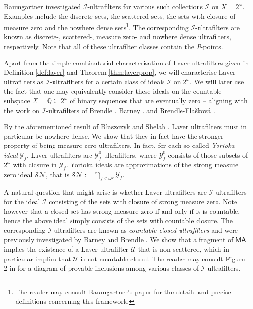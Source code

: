 \documentclass[12pt]{article}
\theoremstyle{definition}
\begin{document}
Baumgartner investigated $\mathcal{I}$-ultrafilters for various such collections $\mathcal{I}$ on $X=2^\omega$. Examples include the discrete sets, the scattered sets, the sets with closure of measure zero and the nowhere dense sets\footnote{The reader may consult Baumgartner's paper for the details and precise definitions concerning this framework.}. The corresponding $\mathcal{I}$-ultrafilters are known as discrete-, scattered-, measure zero- and nowhere dense ultrafilters, respectively. Note that all of these ultrafilter classes contain the $P$-points.

Apart from the simple combinatorial characterisation of Laver ultrafilters given in Definition \ref{def:laver} and Theorem \ref{thm:laverprop}, we will characterise Laver ultrafilters as $\mathcal{I}$-ultrafilters for a certain class of ideals $\mathcal{I}$ on $2^\omega$. We will later use the fact that one may equivalently consider these ideals on the countable subspace $X=\mathbb{Q}\subseteq 2^\omega$ of binary sequences that are eventually zero --  aligning with the work on $\mathcal{I}$-ultrafilters of Brendle \cite{brendle-between}, Barney \cite{barney-uf}, and Brendle-Fla\v{s}kov\'a \cite{brefla17}.

By the aforementioned result of B{\l}aszczyk and Shelah \cite{blaszczyk2001regular}, Laver ultrafilters must in particular be nowhere dense. We show that they in fact have the stronger property of being measure zero ultrafilters. In fact, for each so-called \textit{Yorioka ideal} $\mathcal{Y}_f$, Laver ultrafilters are $\mathcal{Y}_f^0$-ultrafilters, where $\mathcal{Y}_f^0$ consists of those subsets of $2^\omega$ with closure in $\mathcal{Y}_f$. Yorioka ideals are approximations of the strong measure zero ideal $\mathcal{SN}$, that is $\mathcal{SN}:=\bigcap_{f\in \omega^\omega}\mathcal{Y}_f$.

A natural question that might arise is whether Laver ultrafilters are $\mathcal{I}$-ultrafilters for the ideal $\mathcal{I}$ consisting of the sets with closure of strong measure zero. Note however that a closed set has strong measure zero if and only if it is countable, hence the above ideal simply consists of the sets with countable closure. The corresponding $\mathcal{I}$-ultrafilters are known as \textit{countable closed ultrafilters} and were previously investigated by Barney \cite{barney-uf} and Brendle \cite{brendle-between}. We show that a fragment of $\textsf{MA}$ implies the existence of a Laver ultrafilter $\mathcal{U}$ that is non-scattered, which in particular implies that $\mathcal{U}$ is not countable closed. The reader may consult Figure 2 in \cite{brefla17} for a diagram of provable inclusions among various classes of $\mathcal{I}$-ultrafilters.
\end{document}
